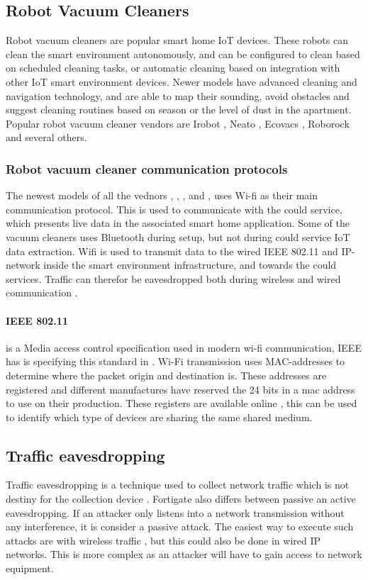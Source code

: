 \subsection{Robot Vacuum Cleaners}
Robot vacuum cleaners are popular smart home IoT devices. These robots can clean the smart environment autonomously, and can be configured to clean based on scheduled cleaning tasks, or automatic cleaning based on integration with other IoT smart environment devices. Newer models have advanced cleaning and navigation technology, and are able to map their sounding, avoid obstacles and suggest cleaning routines based on season or the level of dust in the apartment. Popular robot vacuum cleaner vendors are Irobot \cite{irobot}, Neato \cite{Neato}, Ecovacs \cite{ecovacs}, Roborock \cite{roborock} and several others. 


\subsubsection{Robot vacuum cleaner communication protocols}
The newest models of all the vednors \cite{irobot}, \cite{Neato}, \cite{ecovacs}, \cite{roborock} and \cite{neatsvor}, uses Wi-fi as their main communication protocol. This is used to communicate with the could service, which presents live data in the associated smart home application. Some of the vacuum cleaners uses Bluetooth during setup, but not during could service IoT data extraction. Wifi \cite{wifi_ieee80211} is used to transmit data to the wired IEEE 802.11 and IP-network inside the smart environment infrastructure, and towards the could services. Traffic can therefor be eavesdropped both during wireless and wired communication \cite{wiredeavsdropping} \cite{wirelesseavsdropping}.

\paragraph{IEEE 802.11} is a Media access control specification used in modern wi-fi communication, IEEE has is specifying this standard in \cite{wifi_ieee80211}.  Wi-Fi transmission uses MAC-addresses \cite{macaddress} to determine where the packet origin and destination is. These addresses are registered and different manufactures have reserved the 24 bits in a mac address to use on their production. These registers are available online \cite{mac_address_lookup}, this can be used to identify which type of devices are sharing the same shared medium. 

\subsection{Traffic eavesdropping}
Traffic eavesdropping is a technique used to collect network traffic which is not destiny for the collection device \cite{eavsdropping_fortinet}. Fortigate also differs between passive an active eavesdropping. If an attacker only listens into a network transmission without any interference, it is consider a passive attack. The easiest way to execute such attacks are with wireless traffic \cite{eavesdroppingwifi}, but this could also be done in wired IP networks. This is more complex as an attacker will have to gain access to network equipment. 

